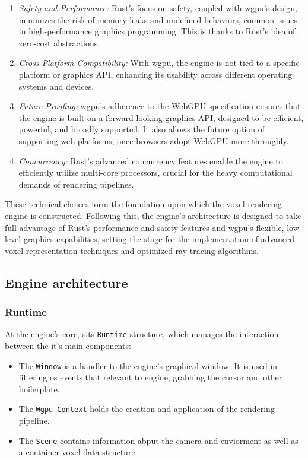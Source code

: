 \begin{enumerate}
  \item \emph{Safety and Performance:} Rust’s focus on safety, coupled with wgpu's design, minimizes the risk of memory leaks and undefined behaviors, common issues in high-performance graphics programming. This is thanks to Rust's idea of zero-cost abstractions.

  \item \emph{Cross-Platform Compatibility:} With wgpu, the engine is not tied to a specific platform or graphics API, enhancing its usability across different operating systems and devices.

  \item \emph{Future-Proofing:} wgpu's adherence to the WebGPU specification ensures that the engine is built on a forward-looking graphics API, designed to be efficient, powerful, and broadly supported. It also allows the future option of supporting web platforms, once browsers adopt WebGPU more throughly.

  \item \emph{Concurrency:} Rust’s advanced concurrency features enable the engine to efficiently utilize multi-core processors, crucial for the heavy computational demands of rendering pipelines.
\end{enumerate}

These technical choices form the foundation upon which the voxel rendering engine is constructed. Following this, the engine's architecture is designed to take full advantage of Rust's performance and safety features and wgpu's flexible, low-level graphics capabilities, setting the stage for the implementation of advanced voxel representation techniques and optimized ray tracing algorithms.


\subsection{Engine architecture}
\subsubsection{Runtime}
\begin{samepage}
At the engine's core, sits \texttt{Runtime}  structure, which manages the interaction between the it's main components:
\begin{itemize}
  \item The \texttt{Window} is a handler to the engine's graphical window. It is used in filtering \acrshort{os} events that relevant to engine, grabbing the cursor and other boilerplate.
  \item The \texttt{Wgpu Context} holds the creation and application of the rendering pipeline.
  \item The \texttt{Scene} contains information abput the camera and enviorment as well as a container voxel data structure.
\end{itemize}
\end{samepage}

